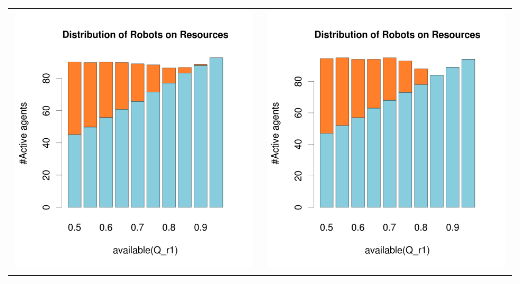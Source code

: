\documentclass[a4paper,10pt]{article}
\begin{document}
\begin{table}[h!]
\begin{tabular}{cc}
 \newline
 \includegraphics[width=\imgSize]{images/5StaticEnv/barplotAliveR1AndR2_mean_env1}& \includegraphics[width=\imgSize]{images/5StaticEnv/barplotAliveR1AndR2_median_env1}
\end{tabular}
\end{table}
\end{document}
